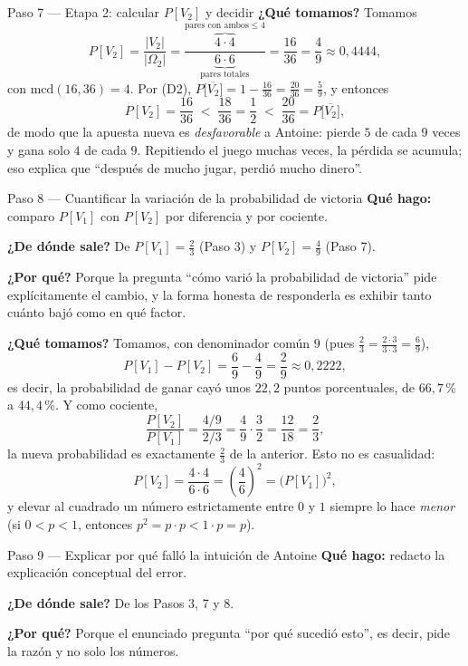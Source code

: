 \documentclass[11pt]{article}
\begin{document}
\begin{sol}
\begin{paso}{Paso 7 --- Etapa 2: calcular $P[V_2]$ y decidir}
\textbf{¿Qué tomamos?} Tomamos
\[
P[V_2]=\frac{|V_2|}{|\Omega_2|}
=\frac{\overbrace{4\cdot 4}^{\text{pares con ambos}\le 4}}{\underbrace{6\cdot 6}_{\text{pares totales}}}
=\frac{16}{36}=\frac{4}{9}\approx 0{,}4444 ,
\]
con $\mathrm{mcd}(16,36)=4$. Por (D2),
$P\big[\overline{V_2}\big]=1-\frac{16}{36}=\frac{20}{36}=\frac59$, y entonces
\[
P[V_2]=\frac{16}{36}\;<\;\frac{18}{36}=\frac12\;<\;\frac{20}{36}=P\big[\overline{V_2}\big] ,
\]
de modo que la apuesta nueva es \emph{desfavorable} a Antoine: pierde $5$ de cada $9$ veces y
gana solo $4$ de cada $9$. Repitiendo el juego muchas veces, la pérdida se acumula; eso explica
que ``después de mucho jugar, perdió mucho dinero''.
\end{paso}

\begin{paso}{Paso 8 --- Cuantificar la variación de la probabilidad de victoria}
\textbf{Qué hago:} comparo $P[V_1]$ con $P[V_2]$ por diferencia y por cociente.

\textbf{¿De dónde sale?} De $P[V_1]=\frac{2}{3}$ (Paso 3) y $P[V_2]=\frac{4}{9}$ (Paso 7).

\textbf{¿Por qué?} Porque la pregunta ``cómo varió la probabilidad de victoria'' pide
explícitamente el cambio, y la forma honesta de responderla es exhibir tanto cuánto bajó como en
qué factor.

\textbf{¿Qué tomamos?} Tomamos, con denominador común $9$ (pues
$\frac{2}{3}=\frac{2\cdot 3}{3\cdot 3}=\frac{6}{9}$),
\[
P[V_1]-P[V_2]=\frac{6}{9}-\frac{4}{9}=\frac{2}{9}\approx 0{,}2222 ,
\]
es decir, la probabilidad de ganar cayó unos $22{,}2$ puntos porcentuales, de $66{,}7$\,\% a
$44{,}4$\,\%. Y como cociente,
\[
\frac{P[V_2]}{P[V_1]}=\frac{4/9}{2/3}=\frac{4}{9}\cdot\frac{3}{2}=\frac{12}{18}=\frac{2}{3},
\]
la nueva probabilidad es exactamente $\frac{2}{3}$ de la anterior. Esto no es casualidad:
\[
P[V_2]=\frac{4\cdot 4}{6\cdot 6}=\left(\frac{4}{6}\right)^{2}=\big(P[V_1]\big)^{2},
\]
y elevar al cuadrado un número estrictamente entre $0$ y $1$ siempre lo hace \emph{menor} (si
$0<p<1$, entonces $p^{2}=p\cdot p<1\cdot p=p$).
\end{paso}

\begin{paso}{Paso 9 --- Explicar por qué falló la intuición de Antoine}
\textbf{Qué hago:} redacto la explicación conceptual del error.

\textbf{¿De dónde sale?} De los Pasos 3, 7 y 8.

\textbf{¿Por qué?} Porque el enunciado pregunta ``por qué sucedió esto'', es decir, pide la
razón y no solo los números.


\end{paso}
\end{sol}
\end{document}
